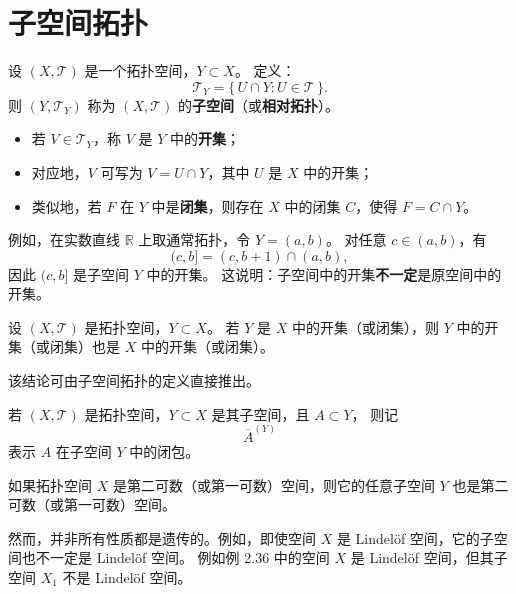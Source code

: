 \section{子空间拓扑}
\begin{definition}[子空间拓扑与相关符号]
设 $(X, \mathcal{T})$ 是一个拓扑空间，$Y \subset X$。  
定义：
\[
\mathcal{T}_Y = \{\,U \cap Y : U \in \mathcal{T}\,\}.
\]
则 $(Y, \mathcal{T}_Y)$ 称为 $(X, \mathcal{T})$ 的\textbf{子空间}（或\textbf{相对拓扑}）。

\begin{itemize}
  \item 若 $V \in \mathcal{T}_Y$，称 $V$ 是 $Y$ 中的\textbf{开集}；
  \item 对应地，$V$ 可写为 $V = U \cap Y$，其中 $U$ 是 $X$ 中的开集；
  \item 类似地，若 $F$ 在 $Y$ 中是\textbf{闭集}，则存在 $X$ 中的闭集 $C$，使得 $F = C \cap Y$。
\end{itemize}

例如，在实数直线 $\mathbb{R}$ 上取通常拓扑，令 $Y = (a,b)$。  
对任意 $c \in (a,b)$，有
\[
(c,b] = (c,b+1) \cap (a,b),
\]
因此 $(c,b]$ 是子空间 $Y$ 中的开集。  
这说明：子空间中的开集\textbf{不一定}是原空间中的开集。

\end{definition}


\begin{proposition}[子空间的开集在父空间也是开集]
设 $(X, \mathcal{T})$ 是拓扑空间，$Y \subset X$。  
若 $Y$ 是 $X$ 中的开集（或闭集），则 $Y$ 中的开集（或闭集）也是 $X$ 中的开集（或闭集）。

\smallskip
该结论可由子空间拓扑的定义直接推出。
\end{proposition}

\begin{definition}[子空间闭包的符号]
若 $(X, \mathcal{T})$ 是拓扑空间，$Y \subset X$ 是其子空间，且 $A \subset Y$，  
则记
\[
\overline{A}^{(Y)}
\]
表示 $A$ 在子空间 $Y$ 中的闭包。

\end{definition}
\begin{theorem}[遗传性质]
如果拓扑空间 $X$ 是第二可数（或第一可数）空间，则它的任意子空间 $Y$ 也是第二可数（或第一可数）空间。
\end{theorem}

\begin{remark}
然而，并非所有性质都是遗传的。例如，即使空间 $X$ 是 Lindelöf 空间，它的子空间也不一定是 Lindelöf 空间。
例如例 2.36 中的空间 $X$ 是 Lindelöf 空间，但其子空间 $X_1$ 不是 Lindelöf 空间。
\end{remark}

